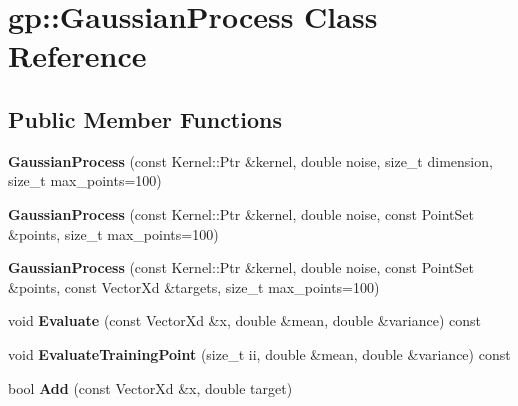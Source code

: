 \hypertarget{classgp_1_1_gaussian_process}{}\section{gp\+:\+:Gaussian\+Process Class Reference}
\label{classgp_1_1_gaussian_process}
\subsection*{Public Member Functions}
\begin{DoxyCompactItemize}
\item 
\hypertarget{classgp_1_1_gaussian_process_a47cdf94a91858d0931115260e5e1704c}{}\label{classgp_1_1_gaussian_process_a47cdf94a91858d0931115260e5e1704c} 
{\bfseries Gaussian\+Process} (const Kernel\+::\+Ptr \&kernel, double noise, size\+\_\+t dimension, size\+\_\+t max\+\_\+points=100)
\item 
\hypertarget{classgp_1_1_gaussian_process_a1e5a8059688294936f4396a88082e335}{}\label{classgp_1_1_gaussian_process_a1e5a8059688294936f4396a88082e335} 
{\bfseries Gaussian\+Process} (const Kernel\+::\+Ptr \&kernel, double noise, const Point\+Set \&points, size\+\_\+t max\+\_\+points=100)
\item 
\hypertarget{classgp_1_1_gaussian_process_a3dcd374d4090be21c059ef8ccde1519c}{}\label{classgp_1_1_gaussian_process_a3dcd374d4090be21c059ef8ccde1519c} 
{\bfseries Gaussian\+Process} (const Kernel\+::\+Ptr \&kernel, double noise, const Point\+Set \&points, const Vector\+Xd \&targets, size\+\_\+t max\+\_\+points=100)
\item 
\hypertarget{classgp_1_1_gaussian_process_a850493ba48793ad4bf2e17043d469928}{}\label{classgp_1_1_gaussian_process_a850493ba48793ad4bf2e17043d469928} 
void {\bfseries Evaluate} (const Vector\+Xd \&x, double \&mean, double \&variance) const
\item 
\hypertarget{classgp_1_1_gaussian_process_a2594af50120c38f7c3d4dd894fb07d32}{}\label{classgp_1_1_gaussian_process_a2594af50120c38f7c3d4dd894fb07d32} 
void {\bfseries Evaluate\+Training\+Point} (size\+\_\+t ii, double \&mean, double \&variance) const
\item 
\hypertarget{classgp_1_1_gaussian_process_a5fa3ef492a2a6a516352ac8e60851753}{}\label{classgp_1_1_gaussian_process_a5fa3ef492a2a6a516352ac8e60851753} 
bool {\bfseries Add} (const Vector\+Xd \&x, double target)
\item 
\hypertarget{classgp_1_1_gaussian_process_a8d9f97258985e244d555f059f5e4c9cb}{}\label{classgp_1_1_gaussian_process_a8d9f97258985e244d555f059f5e4c9cb} 

\end{DoxyCompactItemize}

